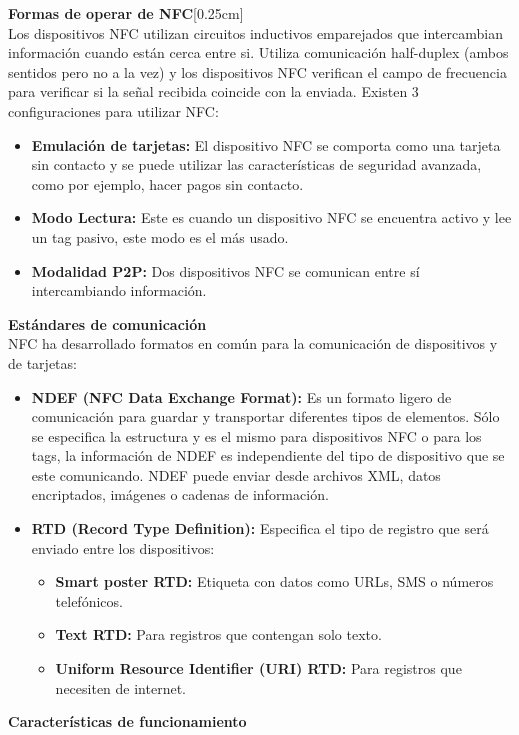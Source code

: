 \documentclass[11pt,openany]{book}
\newcounter{ns}
\begin{document}
	\textbf{Formas de operar de NFC}[0.25cm]\\
	Los dispositivos NFC utilizan circuitos inductivos emparejados que intercambian información cuando están cerca entre si. Utiliza comunicación half-duplex (ambos sentidos pero no a la vez) y los dispositivos NFC verifican el campo de frecuencia para verificar si la señal recibida coincide con la enviada. Existen 3 configuraciones para utilizar NFC:
	\begin{itemize}
		\item \textbf{Emulación de tarjetas: }El dispositivo NFC se comporta como una tarjeta sin contacto y se puede utilizar las características de seguridad avanzada, como por ejemplo, hacer pagos sin contacto.
		\item \textbf{Modo Lectura: }Este es cuando un dispositivo NFC se encuentra activo y lee un tag pasivo, este modo es el más usado.
		\item \textbf{Modalidad P2P: }Dos dispositivos NFC se comunican entre sí intercambiando información.
	\end{itemize}
	\textbf{Estándares de comunicación}\\[0.25cm]
	NFC ha desarrollado formatos en común para la comunicación de dispositivos y de tarjetas:\\
	\begin{itemize}
		\item \textbf{NDEF (NFC Data Exchange Format): }Es un formato ligero de comunicación para guardar y transportar diferentes tipos de elementos. Sólo se especifica la estructura y es el mismo para dispositivos NFC o para los tags, la información de NDEF es independiente del tipo de dispositivo que se este comunicando. NDEF puede enviar desde archivos XML, datos encriptados, imágenes o cadenas de información.
		\item \textbf{RTD (Record Type Definition): }Especifica el tipo de registro que será enviado entre los dispositivos:
		\begin{itemize}
			\item \textbf{Smart poster RTD: }Etiqueta con datos como URLs, SMS o números telefónicos.

			\item \textbf{Text RTD: }Para registros que contengan solo texto.
			\item \textbf{Uniform Resource Identifier (URI) RTD: }Para registros que necesiten de internet.
		\end{itemize}
	\end{itemize}
	\textbf{Características de funcionamiento}\\[0.25cm]
\end{document}
